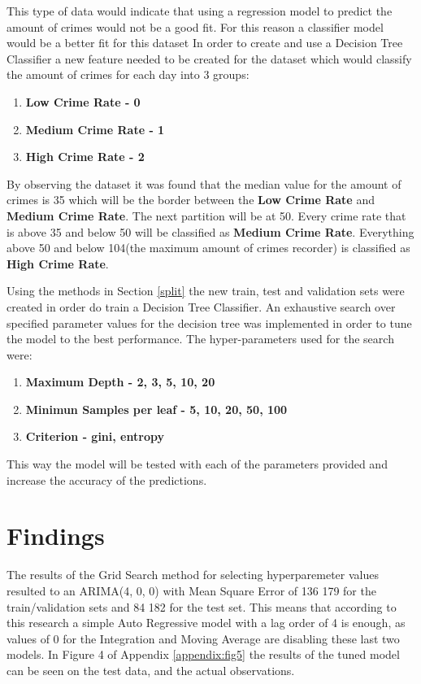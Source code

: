 \documentclass[a4paper, twocolumn]{article}
\begin{document}
This type of data would indicate that using a regression model to predict the amount of crimes would not be a good fit.
For this reason a classifier model would be a better fit for this dataset
In order to create and use a Decision Tree Classifier a new feature needed to be created for the dataset which
would classify the amount of crimes for each day into 3 groups:
\begin{enumerate}
    \item \textbf{Low Crime Rate - 0}
    \item \textbf{Medium Crime Rate - 1}
    \item \textbf{High Crime Rate - 2}
\end{enumerate}
By observing the dataset it was found that the median value for the amount of crimes is 35 which will be the border between the
\textbf{Low Crime Rate} and \textbf{Medium Crime Rate}. The next partition will be at 50. Every crime rate that is above 35 and 
below 50 will be classified as \textbf{Medium Crime Rate}. Everything above 50 and below 104(the maximum amount of crimes recorder)
is classified as \textbf{High Crime Rate}.

Using the methods in Section \ref{split} the new train, test and validation sets were created in order do train a Decision Tree Classifier.
An exhaustive search over specified parameter values for the decision tree was implemented in order to tune the model to the best performance.
The hyper-parameters used for the search were:
\begin{enumerate}
    \item \textbf{Maximum Depth - 2, 3, 5, 10, 20}
    \item \textbf{Minimun Samples per leaf - 5, 10, 20, 50, 100}
    \item \textbf{Criterion - gini, entropy}
\end{enumerate}

This way the model will be tested with each of the parameters provided and increase the accuracy of the predictions.

\section{Findings}
The results of the Grid Search method for selecting hyperparemeter values resulted to an ARIMA(4, 0, 0) 
with Mean Square Error of 136 179 for the train/validation sets and 84 182 for the test set. 
This means that according to this research a simple Auto Regressive model with a lag order of 4 is enough, as values of 0 
for the Integration and Moving Average are disabling these last two models. 
In Figure 4 of Appendix \ref{appendix:fig5} the results of the tuned model can be seen on the test data, and the actual observations.
\end{document}
